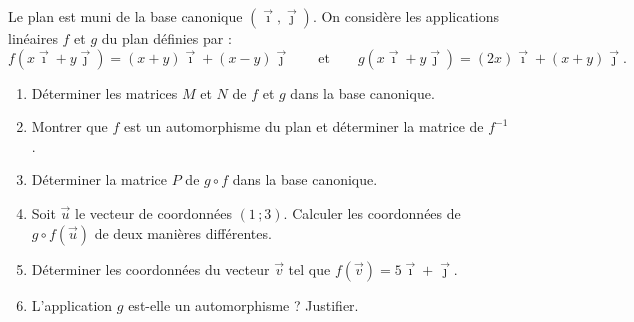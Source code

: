 \documentclass[11pt]{article}
\begin{document}
\begin{exercice}
Le plan est muni de la base canonique $(\vec{\imath},\vec{\jmath})$. On considère les applications linéaires $f$ et $g$ du plan définies par :
\[ f(x\vec{\imath}+y\vec{\jmath})=(x+y)\vec{\imath}+(x-y)\vec{\jmath} \qquad\text{et}\qquad g(x\vec{\imath}+y\vec{\jmath})=(2x)\vec{\imath}+(x+y)\vec{\jmath}. \]
\begin{enumerate}
\item Déterminer les matrices $M$ et $N$ de $f$ et $g$ dans la base canonique.
\item Montrer que $f$ est un automorphisme du plan et déterminer la matrice de $f^{-1}$.
\item Déterminer la matrice $P$ de $g\circ f$ dans la base canonique.
\item Soit $\vec{u}$ le vecteur de coordonnées $(1\,;3)$. Calculer les coordonnées de $g\circ f(\vec{u})$ de deux manières différentes.
\item Déterminer les coordonnées du vecteur $\vec{v}$ tel que $f(\vec{v})=5\vec{\imath}+\vec{\jmath}$.
\item L'application $g$ est-elle un automorphisme ? Justifier.
\end{enumerate}
\end{exercice}
\end{document}
